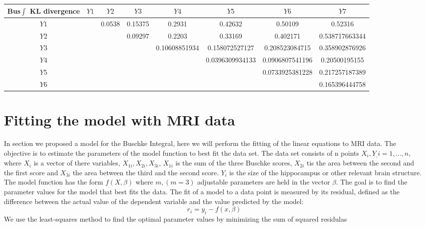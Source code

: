 \documentclass[9pt,twocolumn,twoside]{pnas-new}
\begin{document}
\begin{center}
\begin{tabular}{SSSSSSSS} \toprule
    {Bus$\int$ KL divergence} & {${Y1}$} & {${Y2}$} & {${Y3}$} & {${Y4}$} & {${Y5}$} & {${Y6}$} & {${Y7}$} \\ \midrule
    {${Y1}$} 	&	&0.0538	&0.15375	&0.2931	&0.42632 &0.50109	&0.52316 \\
    {${Y2}$} 	&	&		&0.09297	&0.2203	&0.33169	&0.402171	&0.538717663344 \\ %
    {${Y3}$}    &	&		&		&0.10608851934		&0.158072527127	&0.208523084715	&0.358902876926 \\  
    {${Y4}$}  	&	&		&		&			&0.0396309934133	&0.0906807541196	&0.20500195155 \\ 
    {${Y5}$}  	&	&		&		&			&		&0.0733925381228		&0.217257187389 \\
    {${Y6}$}  	&	&		&		&			&		&			&0.165396444758 \\ \bottomrule
\end{tabular}
\end{center}


\section{Fitting the model with MRI data}
In section we proposed a model for the Buschke Integral, here we will perform the fitting of the linear equations to MRI data. The objective is to estimate the parameters of the model function to best fit the data set. The data set consists of n points $X_i,Y_, i = 1, ..., n$, where $X_i$ is a vector of there variables, $X_{1i},X_{2i},X_{3i}$, $X_{1i}$ is the sum of the three Buschke scores, $X_{2i}$ tis the area between the second and the first score and $X_{3i}$ the area between the third and the second score. $Y_i$ is the size of the hippocampus or other relevant brain structure.
The model function has the form $f(X,\beta)$  where $m, (m=3)$ adjustable parameters are held in the vector $\beta$.
The goal is to find the parameter values for the model that best fits the data. The fit of a model to a data point is measured by its residual, defined as the difference between the actual value of the dependent variable and the value predicted by the model: 
\begin{equation}
r_i = y_i - f(x,\beta)
\end{equation}
We use the least-squares method to find the optimal parameter values by minimizing the sum of squared residulas
\end{document}
